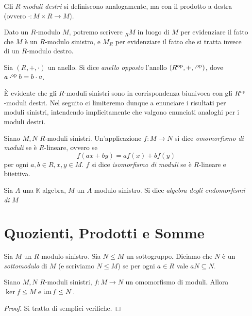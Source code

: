 Gli \emph{$R$-moduli destri} si definiscono analogamente, ma con il prodotto a destra (ovvero $\cdot:M\times R\to M$).

Dato un $R$-modulo $M$, potremo scrivere $_RM$ in luogo di $M$ per evidenziare il fatto che $M$ è un $R$-modulo sinistro, e $M_R$ per evidenziare il fatto che si tratta invece di un $R$-modulo destro.

\begin{definition}
Sia $(R,+,\cdot)$ un anello. Si dice \emph{anello opposto} l'anello $(R^\text{op},+,\cdot^\text{op})$, dove $a\cdot^\text{op}b=b\cdot a$.
\end{definition}

È evidente che gli $R$-moduli sinistri sono in corrispondenza biunivoca con gli $R^\text{op}$-moduli destri. Nel seguito ci limiteremo dunque a enunciare i risultati per moduli sinistri, intendendo implicitamente che valgono enunciati analoghi per i moduli destri.

\begin{definition}
Siano $M,N$ $R$-moduli sinistri. Un'applicazione $f:M\to N$ si dice \emph{omomorfismo di moduli} se è $R$-lineare, ovvero se
$$
f(ax+by)=af(x)+bf(y)
$$
per ogni $a,b\in R\comma x,y\in M$. $f$ si dice \emph{isomorfismo di moduli} se è $R$-lineare e biiettiva.
\end{definition}


\begin{definition}
Sia $A$ una $\mathbb{K}$-algebra, $M$ un $A$-modulo sinistro. Si dice \emph{algebra degli endomorfismi di $M$} 
\end{definition}



\section{Quozienti, Prodotti e Somme}

\begin{definition}
Sia $M$ un $R$-modulo sinistro. Sia $N\le M$ un sottogruppo. Diciamo che $N$ è un \emph{sottomodulo} di $M$ (e scriviamo $N\le M$) se per ogni $a\in R$ vale $aN\subseteq N$.
\end{definition}

\begin{proposition}
Siano $M,N$ $R$-moduli sinistri, $f:M\to N$ un omomorfismo di moduli. Allora $\ker f\le M$ e $\operatorname{im} f\le N$.
\end{proposition}
\begin{proof}
Si tratta di semplici verifiche.
\end{proof}

